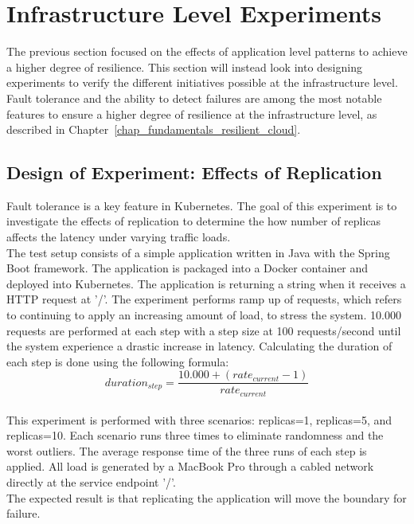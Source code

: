 \newpage
\section{Infrastructure Level Experiments}\label{sec:exp_replication}
The previous section focused on the effects of application level patterns to achieve a higher degree of resilience. This section will instead look into designing experiments to verify the different initiatives possible at the infrastructure level. Fault tolerance and the ability to detect failures are among the most notable features to ensure a higher degree of resilience at the infrastructure level, as described in Chapter~\ref{chap_fundamentals_resilient_cloud}.

\subsection*{Design of Experiment: Effects of Replication}
Fault tolerance is a key feature in Kubernetes. The goal of this experiment is to investigate the effects of replication to determine the how number of replicas affects the latency under varying traffic loads.  \\ 

\noindent The test setup consists of a simple application written in Java with the Spring Boot framework. The application is packaged into a Docker container and deployed into Kubernetes. The application is returning a string when it receives a HTTP request at '/'. The experiment performs ramp up of requests, which refers to continuing to apply an increasing amount of load, to stress the system. 10.000 requests are performed at each step with a step size at 100 requests/second until the system experience a drastic increase in latency. Calculating the duration of each step is done using the following formula: \\

\[ duration_{step}
  = \dfrac{10.000 + (rate_{current}-1)}{rate_{current}}
\] \\

\noindent
This experiment is performed with three scenarios: replicas=1, replicas=5, and replicas=10. Each scenario runs three times to eliminate randomness and the worst outliers. The average response time of the three runs of each step is applied. All load is generated by a MacBook Pro through a cabled network directly at the service endpoint '/'. \\

\noindent
The expected result is that replicating the application will move the boundary for failure. \\

